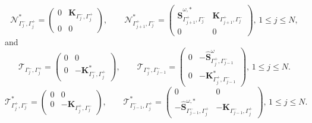 \documentclass[10pt,reqno,oneside]{amsart}%
\theoremstyle{definition}
\theoremstyle{remark}
\numberwithin{equation}{section}
\numberwithin{equation}{section}
\begin{document}
\begin{equation}
\mathcal{N}^{*}_{{\Gamma_{j}^-},{\Gamma_{j}^+}}=
\begin{pmatrix}
0 &{\mathbf{K}}_{\Gamma_{j}^-,\Gamma_{j}^+} \\
0&0
\end{pmatrix},\quad \quad
\mathcal{N}^{*}_{\Gamma_{j+1}^+,{\Gamma_{j}^-}}=
\begin{pmatrix}
\hat{\mathbf{S}}_{\Gamma_{j+1}^+,\Gamma_{j}^-}^{\omega,*} &{\mathbf{K}}_{\Gamma_{j+1}^+,\Gamma_{j}^-} \\
0&0
\end{pmatrix},\,1\leq j\leq N,\nonumber
\end{equation}
and
\begin{equation}
\mathcal{T}_{{\Gamma_{j}^-},{\Gamma_{j}^+}}=
\begin{pmatrix}
0& 0 \\
0& -{\mathbf{K}}_{\Gamma_{j}^-,\Gamma_{j}^+}^{*}
\end{pmatrix},\quad \quad
\mathcal{T}_{{\Gamma_{j}^+},{\Gamma_{j-1}^-}}=
\begin{pmatrix}
0& -\hat{\mathbf{S}}_{\Gamma_{j}^+,\Gamma_{j-1}^-}^{\omega}  \\
0& -{\mathbf{K}}_{\Gamma_{j}^+,\Gamma_{j-1}^-}^{*}
\end{pmatrix},\,1\leq j\leq N.\nonumber
\end{equation}
\begin{equation}
\mathcal{T}^{*}_{{\Gamma_{j}^+},{\Gamma_{j}^-}}=
\begin{pmatrix}
0& 0 \\
0& -{\mathbf{K}}_{\Gamma_{j}^+,\Gamma_{j}^-}
\end{pmatrix},\quad \quad
\mathcal{T}^{*}_{{\Gamma_{j-1}^-},{\Gamma_{j}^+}}=
\begin{pmatrix}
0&  0 \\
-\hat{\mathbf{S}}_{\Gamma_{j-1}^-,\Gamma_{j}^+}^{\omega,*}& -{\mathbf{K}}_{\Gamma_{j-1}^-,\Gamma_{j}^+}
\end{pmatrix},\,1\leq j\leq N.\nonumber
\end{equation}
\end{document}
